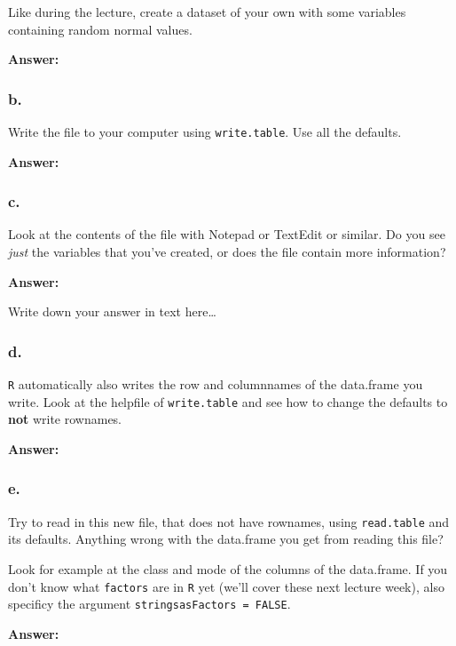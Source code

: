 \documentclass[]{article}
\begin{document}
Like during the lecture, create a dataset of your own with some
variables containing random normal values.

\textbf{Answer:}

\hypertarget{b.-4}{%
\subsubsection{b.}\label{b.-4}}

Write the file to your computer using \texttt{write.table}. Use all the
defaults.

\textbf{Answer:}

\hypertarget{c.-4}{%
\subsubsection{c.}\label{c.-4}}

Look at the contents of the file with Notepad or TextEdit or similar. Do
you see \emph{just} the variables that you've created, or does the file
contain more information?

\textbf{Answer:}

Write down your answer in text here\ldots{}

\hypertarget{d.-4}{%
\subsubsection{d.}\label{d.-4}}

\texttt{R} automatically also writes the row and columnnames of the
data.frame you write. Look at the helpfile of \texttt{write.table} and
see how to change the defaults to \textbf{not} write rownames.

\textbf{Answer:}

\hypertarget{e.-3}{%
\subsubsection{e.}\label{e.-3}}

Try to read in this new file, that does not have rownames, using
\texttt{read.table} and its defaults. Anything wrong with the data.frame
you get from reading this file?

Look for example at the class and mode of the columns of the data.frame.
If you don't know what \texttt{factors} are in \texttt{R} yet (we'll
cover these next lecture week), also specificy the argument
\texttt{stringsasFactors\ =\ FALSE}.

\textbf{Answer:}
\end{document}
